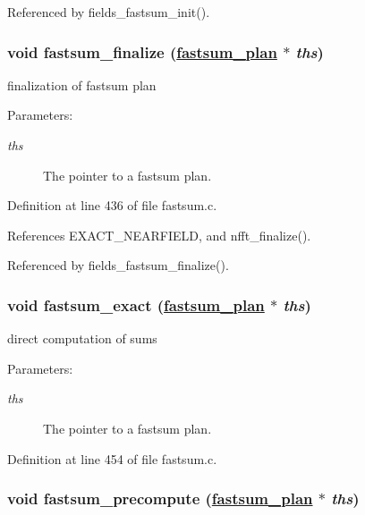 Referenced by fields\_\-fastsum\_\-init().\hypertarget{group__applications__fastsum_ga14}{
\subsubsection[fastsum\_\-finalize]{\setlength{\rightskip}{0pt plus 5cm}void fastsum\_\-finalize (\hyperlink{structfastsum__plan__}{fastsum\_\-plan} $\ast$ {\em ths})}}
\label{group__applications__fastsum_ga14}


finalization of fastsum plan 

\begin{Desc}
\item[Parameters:]
\begin{description}
\item[{\em ths}]The pointer to a fastsum plan. \end{description}
\end{Desc}


Definition at line 436 of file fastsum.c.

References EXACT\_\-NEARFIELD, and nfft\_\-finalize().

Referenced by fields\_\-fastsum\_\-finalize().\hypertarget{group__applications__fastsum_ga15}{
\subsubsection[fastsum\_\-exact]{\setlength{\rightskip}{0pt plus 5cm}void fastsum\_\-exact (\hyperlink{structfastsum__plan__}{fastsum\_\-plan} $\ast$ {\em ths})}}
\label{group__applications__fastsum_ga15}


direct computation of sums 

\begin{Desc}
\item[Parameters:]
\begin{description}
\item[{\em ths}]The pointer to a fastsum plan. \end{description}
\end{Desc}


Definition at line 454 of file fastsum.c.\hypertarget{group__applications__fastsum_ga16}{
\subsubsection[fastsum\_\-precompute]{\setlength{\rightskip}{0pt plus 5cm}void fastsum\_\-precompute (\hyperlink{structfastsum__plan__}{fastsum\_\-plan} $\ast$ {\em ths})}}
\label{group__applications__fastsum_ga16}


